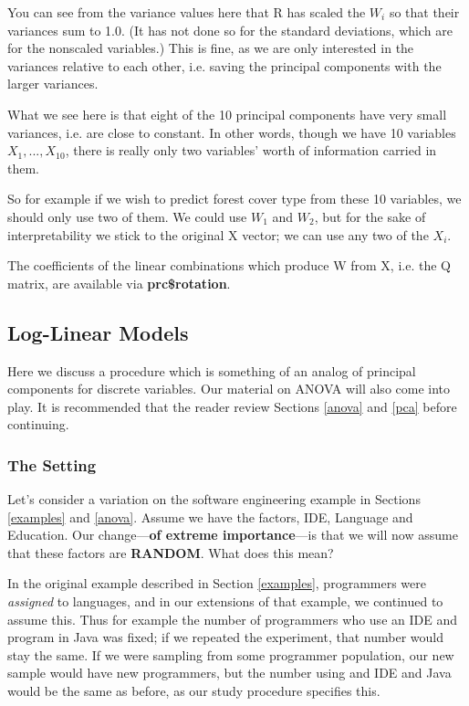 You can see from the variance values here that R has scaled the $W_i$ so
that their variances sum to 1.0.  (It has not done so for the standard
deviations, which are for the nonscaled variables.) This is fine, as we
are only interested in the variances relative to each other, i.e. saving
the principal components with the larger variances.

What we see here is that eight of the 10 principal components have very
small variances, i.e. are close to constant.  In other words, though we
have 10 variables $X_1,...,X_{10}$, there is really only two
variables' worth of information carried in them.  

So for example if we wish to predict forest cover type from these 10
variables, we should only use two of them.  We could use $W_1$ and
$W_2$, but for the sake of interpretability we stick to the original X
vector; we can use any two of the $X_i$.

The coefficients of the linear combinations which produce W from X, i.e.
the Q matrix, are available via {\bf prc\$rotation}.

\subsection{Log-Linear Models}
\label{loglin}

Here we discuss a procedure which is something of an analog of principal
components for discrete variables.  Our material on ANOVA will also come
into play.  It is recommended that the reader review Sections \ref{anova}
and \ref{pca} before continuing.

\subsubsection{The Setting}

Let's consider a variation on the software engineering example in
Sections \ref{examples} and \ref{anova}.  Assume we have the factors,
IDE, Language and Education.  Our change---{\bf of extreme
importance}---is that we will now assume that these factors are {\bf
RANDOM}.  What does this mean?

In the original example described in Section \ref{examples}, programmers
were {\it assigned} to languages, and in our extensions of that example,
we continued to assume this.  Thus for example the number of programmers
who use an IDE and program in Java was fixed; if we repeated the
experiment, that number would stay the same.  If we were sampling from
some programmer population, our new sample would have new programmers,
but the number using and IDE and Java would be the same as before, as
our study procedure specifies this.

